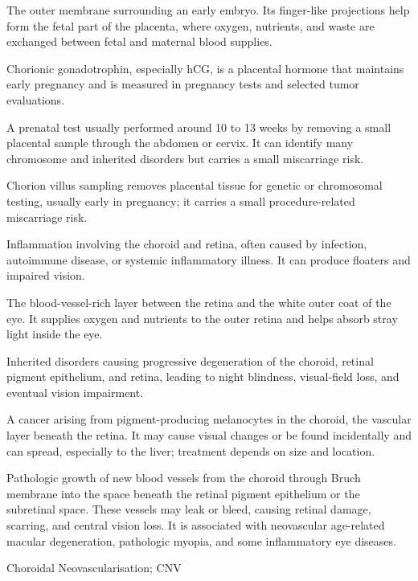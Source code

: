  The outer membrane surrounding an early embryo. Its finger-like projections help form the fetal part of the placenta, where oxygen, nutrients, and waste are exchanged between fetal and maternal blood supplies.

 Chorionic gonadotrophin, especially hCG, is a placental hormone that maintains early pregnancy and is measured in pregnancy tests and selected tumor evaluations.

 A prenatal test usually performed around 10 to 13 weeks by removing a small placental sample through the abdomen or cervix. It can identify many chromosome and inherited disorders but carries a small miscarriage risk.

 Chorion villus sampling removes placental tissue for genetic or chromosomal testing, usually early in pregnancy; it carries a small procedure-related miscarriage risk.

 Inflammation involving the choroid and retina, often caused by infection, autoimmune
disease, or systemic inflammatory illness. It can produce floaters and impaired vision.

 The blood-vessel-rich layer between the retina and the white outer coat of the eye. It supplies oxygen and nutrients to the outer retina and helps absorb stray light inside the eye.

 Inherited disorders causing progressive degeneration of the choroid, retinal pigment epithelium, and retina, leading to night blindness, visual-field loss, and eventual vision impairment.

 A cancer arising from pigment-producing melanocytes in the choroid, the vascular layer beneath the retina. It may cause visual changes or be found incidentally and can spread, especially to the liver; treatment depends on size and location.

 Pathologic growth of new blood vessels from the choroid through Bruch membrane into the space beneath the retinal pigment epithelium or the subretinal space. These vessels may leak or bleed, causing retinal damage, scarring, and central vision loss. It is associated with neovascular age-related macular degeneration, pathologic myopia, and some inflammatory eye diseases.

\synonyms
Choroidal Neovascularisation; CNV

